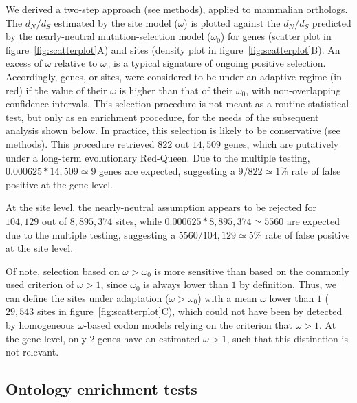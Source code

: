\documentclass{article}
\newcommand{\dn}{d_N}
\newcommand{\ds}{d_S}
\newcommand{\dnds}{\dn / \ds}
\begin{document}
    We derived a two-step approach (see methods), applied to mammalian orthologs.
    The $\dnds$ estimated by the site model ($\omega$) is plotted against the $\dnds$ predicted by the nearly-neutral mutation-selection model ($\omega_{0}$) for genes (scatter plot in figure~\ref{fig:scatterplot}A) and sites (density plot in figure~\ref{fig:scatterplot}B).
    An excess of $\omega$ relative to $\omega_{0}$ is a typical signature of ongoing positive selection\cite{bloom_identification_2017, rodrigue_detecting_2017}.
    Accordingly, genes, or sites, were considered to be under an adaptive regime (in red) if the value of their $\omega$ is higher than that of their $\omega_{0}$, with non-overlapping confidence intervals.
    This selection procedure is not meant as a routine statistical test, but only as en enrichment procedure, for the needs of the subsequent analysis shown below.
    In practice, this selection is likely to be conservative (see methods).
    This procedure retrieved $822$ out $14,509$ genes, which are putatively under a long-term evolutionary Red-Queen.
    Due to the multiple testing, $0.000625 * 14,509 \simeq 9$ genes are expected, suggesting a $9 / 822 \simeq 1\%$ rate of false positive at the gene level.

    At the site level, the nearly-neutral assumption appears to be rejected for $104,129$ out of $8,895,374$ sites, while $0.000625 * 8,895,374 \simeq 5560$ are expected due to the multiple testing, suggesting a $5560 / 104,129 \simeq 5\%$ rate of false positive at the site level.

    Of note, selection based on $\omega>\omega_{0}$ is more sensitive than based on the commonly used criterion of $\omega>1$, since $\omega_{0}$ is always lower than $1$ by definition\cite{spielman_relationship_2015}.
    Thus, we can define the sites under adaptation ($\omega>\omega_{0}$) with a mean $\omega$ lower than $1$ ($29,543$ sites in figure~\ref{fig:scatterplot}C), which could not have been by detected by homogeneous $\omega$-based codon models relying on the criterion that $\omega>1$.
    At the gene level, only 2 genes have an estimated $\omega > 1$, such that this distinction is not relevant.

    \subsection*{Ontology enrichment tests}
\end{document}

